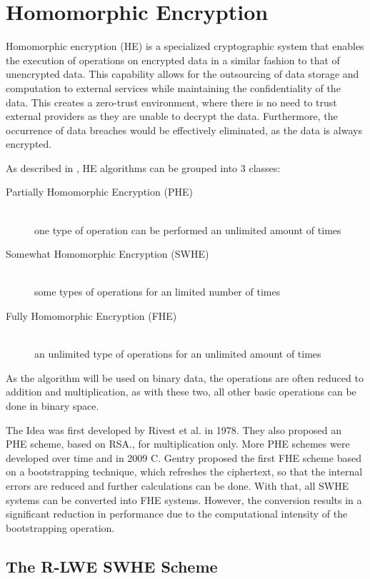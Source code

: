 \chapter{Homomorphic Encryption}

Homomorphic encryption (HE) is a specialized cryptographic system that enables the execution of operations on encrypted data in a similar fashion to that of unencrypted data. This capability allows for the outsourcing of data storage and computation to external services while maintaining the confidentiality of the data. This creates a zero-trust environment, where there is no need to trust external providers as they are unable to decrypt the data. Furthermore, the occurrence of data breaches would be effectively eliminated, as the data is always encrypted.


As described in \cite{FheImplementations}, HE algorithms can be grouped into 3 classes:
\begin{description}
  \item [Partially Homomorphic Encryption (PHE)]\hfill \\one type of operation can be performed an unlimited amount of times
  \item [Somewhat Homomorphic Encryption (SWHE)]\hfill \\some types of operations for an limited number of times
  \item [Fully Homomorphic Encryption (FHE)]\hfill \\an unlimited type of operations for an unlimited amount of times
\end{description}

As the algorithm will be used on binary data, the operations are often reduced to addition and multiplication, as with these two, all other basic operations can be done in binary space.

The Idea was first developed by Rivest et al. \cite{Rivest1978} in 1978. They also proposed an PHE scheme, based on RSA., for multiplication only. More PHE schemes were developed over time and in 2009 C. Gentry proposed the first FHE scheme \cite{Gentry2009AFH} based on a bootstrapping technique, which refreshes the ciphertext, so that the internal errors are reduced and further calculations can be done. With that, all SWHE systems can be converted into FHE systems. However, the conversion results in a significant reduction in performance due to the computational intensity of the bootstrapping operation.

\section{The R-LWE SWHE Scheme}


